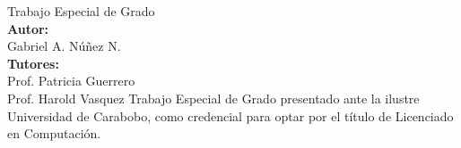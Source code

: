 \begin{titlepage}
	\begin{center}
	\membrete
	\vfill
	Trabajo Especial de Grado\\
	\titulo
	\vfill
	\textbf{Autor:}\\
	Gabriel A. N\'{u}\~{n}ez N.\\
	\vfill
	\textbf{Tutores:} \\
	Prof. Patricia Guerrero \\
	Prof. Harold Vasquez
	\vfill
	Trabajo Especial de Grado presentado ante la ilustre Universidad de Carabobo, como credencial para optar por el t\'{i}tulo de Licenciado en Computaci\'{o}n.
	\vfill
	\fecha
	\end{center}
\end{titlepage}